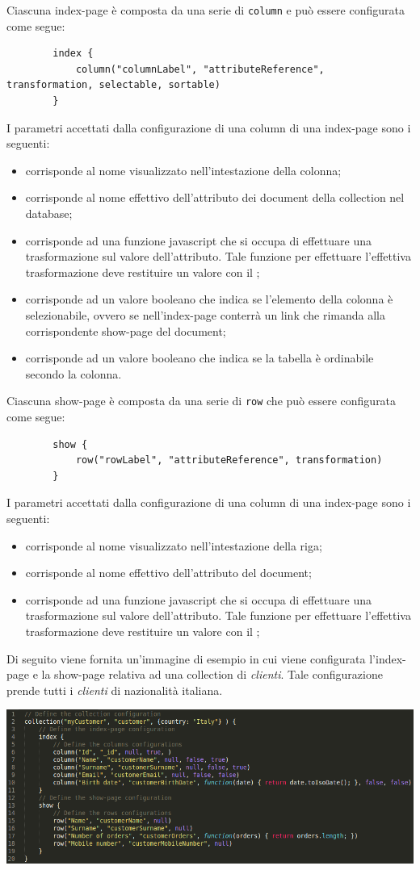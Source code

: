 Ciascuna index-page è composta da una serie di \texttt{column} e può essere configurata come segue: 
\begin{lstlisting}
		index {
			column("columnLabel", "attributeReference", transformation, selectable, sortable)
		}		
\end{lstlisting}
I parametri accettati dalla configurazione di una column di una index-page sono i seguenti: 
\begin{itemize}
\item[]  corrisponde al nome visualizzato nell'intestazione della colonna;
\item[]  corrisponde al nome effettivo dell'attributo dei document della collection nel database;
\item[]  corrisponde ad una funzione javascript che si occupa di effettuare una trasformazione sul valore dell'attributo. Tale funzione per effettuare l'effettiva trasformazione deve restituire un valore con il ;
\item[]  corrisponde ad un valore booleano che indica se l'elemento della colonna è selezionabile, ovvero se nell'index-page conterrà un link che rimanda alla corrispondente show-page del document;
\item[]  corrisponde ad un valore booleano che indica se la tabella è ordinabile secondo la colonna.
\end{itemize}

Ciascuna show-page è composta da una serie di \texttt{row} che può essere configurata come segue: 
\begin{lstlisting}
		show {
			row("rowLabel", "attributeReference", transformation)
		}		
\end{lstlisting}
I parametri accettati dalla configurazione di una column di una index-page sono i seguenti: 
\begin{itemize}
\item[]  corrisponde al nome visualizzato nell'intestazione della riga;
\item[]  corrisponde al nome effettivo dell'attributo del document;
\item[]  corrisponde ad una funzione javascript che si occupa di effettuare una trasformazione sul valore dell'attributo. Tale funzione per effettuare l'effettiva trasformazione deve restituire un valore con il ;
\end{itemize}

Di seguito viene fornita un'immagine di esempio in cui viene configurata l'index-page e la show-page relativa ad una collection di \textit{clienti}. Tale configurazione prende tutti i \textit{clienti} di nazionalità italiana.


\includegraphics[scale=0.5]{images/dsl-example.png} 
